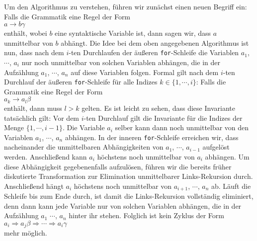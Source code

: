 Um den Algorithmus zu verstehen, f\"uhren wir zun\"achst einen neuen Begriff ein:  Falls die Grammatik
eine Regel der Form
\\[0.2cm]
\hspace*{1.3cm}
$a \rightarrow b \gamma$
\\[0.2cm]
enth\"alt, wobei $b$ eine syntaktische Variable ist, dann sagen wir, dass $a$ unmittelbar von $b$
abh\"angt.  Die Idee bei dem oben angegebenen Algorithmus ist nun, dass nach dem $i$-ten
Durchlaufen der \"au{\ss}eren \texttt{for}-Schleife die Variablen $a_1$, $\cdots$, $a_i$ nur noch unmittelbar
von solchen Variablen abh\"angen, die in der Aufz\"ahlung $a_1$, $\cdots$, $a_n$ auf diese  Variablen
folgen.  Formal gilt nach dem $i$-ten Durchlauf der \"au{\ss}eren \texttt{for}-Schleife f\"ur alle Indizes 
$k \in \{ 1, \cdots, i \}$:  Falls die Grammatik eine Regel der Form
\\[0.2cm]
\hspace*{1.3cm}
$a_k \rightarrow a_l \beta$ 
\\[0.2cm]
enth\"alt, dann muss $l > k$ gelten.  Es ist leicht zu sehen, dass diese Invariante tats\"achlich gilt:
Vor dem $i$-ten Durchlauf gilt die Invariante f\"ur die Indizes der Menge $\{1, \cdots, i-1\}$.  Die
Variable $a_i$ selber kann dann noch unmittelbar von den Variablen $a_1$, $\cdots$, $a_n$ abh\"angen.
In der inneren \texttt{for}-Schleife erreichen wir, dass nacheinander die unmittelbaren
Abh\"angigkeiten von $a_1$, $\cdots$, $a_{i-1}$ aufgel\"ost werden.  Anschlie{\ss}end kann $a_i$ h\"ochstens
noch unmittelbar von $a_i$ abh\"angen.  Um diese Abh\"angigkeit gegebenenfalls aufzul\"osen, f\"uhren wir
die bereits fr\"uher diskutierte Transformation zur Elimination unmittelbarer Links-Rekursion durch.
Anschlie{\ss}end h\"angt $a_i$ h\"ochstens noch 
unmittelbar von $a_{i+1}$, $\cdots$, $a_n$ ab.  L\"auft die Schleife bis zum Ende durch, ist damit
die Links-Rekursion vollst\"andig eliminiert, denn dann kann jede Variable nur von solchen
Variablen abh\"angen, die in der Aufz\"ahlung $a_1$ $\cdots$, $a_n$ hinter ihr stehen.  Folglich ist 
kein Zyklus der Form 
\\[0.2cm]
\hspace*{1.3cm}
$a_i \Rightarrow a_j\beta \Rightarrow \cdots \Rightarrow a_i\gamma$
\\[0.2cm]
mehr m\"oglich.

